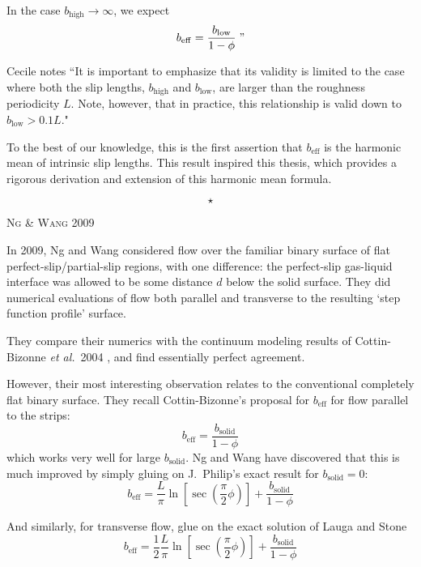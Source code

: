 \documentclass[12pt, a4paper, twoside, openright]{book}
\newcommand{\beff}{\ensuremath{b_{\mathrm{eff}}}}
\newcommand{\bhigh}{\ensuremath{b_{\mathrm{high}}}}
\newcommand{\blow}{\ensuremath{b_{\mathrm{low}}}}
\newcommand{\sep}{\begin{equation*} \star \end{equation*}}
\newcommand{\paper}[1]
         {\colorbox[gray]{0.8}{ \textsc{#1}}
         
         }
\begin{document}
In the case $b_{\mathrm{high}} \rightarrow \infty$, we expect
\begin{equation}
\beff = \frac{b_{\mathrm{low}}}{1-\phi} \;"
\end{equation}

Cecile notes ``It is important to emphasize that its validity is limited to the case where both the slip lengths, $\bhigh$ and $\blow$, are larger than the roughness periodicity $L$. Note, however, that in practice, this relationship is valid down to $\blow > 0.1L$."

To the best of our knowledge, this is the first assertion that $\beff$ is the harmonic mean of intrinsic slip lengths.  This result inspired this thesis, which provides a rigorous derivation and extension of this harmonic mean formula.

\sep

\paper{Ng \& Wang 2009}
In 2009, Ng and Wang \cite{NgWang2009} considered flow over the familiar binary surface of flat perfect-slip/partial-slip regions, with one difference: the perfect-slip gas-liquid interface was allowed to be some distance $d$ below the solid surface.  They did numerical evaluations of flow both parallel and transverse to the resulting `step function profile' surface.

They compare their numerics with the continuum modeling results of Cottin-Bizonne \emph{et al.}\ 2004 \cite{Cottin-Bizonne2004}, and find essentially perfect agreement.

However, their most interesting observation relates to the conventional completely flat binary surface.  They recall Cottin-Bizonne's proposal for $\beff$ for flow parallel to the strips:
\begin{equation}
\beff = \frac{b_{\mathrm{solid}}}{1 - \phi}
\end{equation}
which works very well for large $b_{\mathrm{solid}}$.  Ng and Wang have discovered that this is much improved by simply gluing on J.\ Philip's exact result \cite{Philip1972} for $b_{\mathrm{solid}}=0$:
\begin{equation}
\beff =  \frac{L}{\pi} \ln \left[ \sec \left( \frac{\pi}{2} \phi \right) \right] +
 \frac{b_{\mathrm{solid}}}{1 - \phi}
\end{equation}

And similarly, for transverse flow, glue on the exact solution of Lauga and Stone \cite{LaugaStone2003}
\begin{equation}
\beff = \frac{1}{2}  \frac{L}{\pi} \ln \left[ \sec \left( \frac{\pi}{2} \phi \right) \right] +
 \frac{b_{\mathrm{solid}}}{1 - \phi}
\end{equation}
\end{document}
